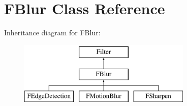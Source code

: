 \hypertarget{classFBlur}{}\section{F\+Blur Class Reference}
\label{classFBlur}
Inheritance diagram for F\+Blur\+:\begin{figure}[H]
\begin{center}
\leavevmode
\includegraphics[height=3.000000cm]{classFBlur}
\end{center}
\end{figure}
